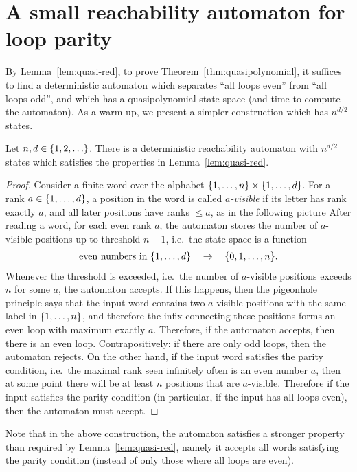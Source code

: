 \section{A small reachability automaton for loop parity}
\label{sec:quasi-separator}
By Lemma~\ref{lem:quasi-red}, to prove Theorem~\ref{thm:quasipolynomial}, it suffices to find a deterministic automaton which  separates ``all loops even'' from ``all loops odd'', and which has a quasipolynomial state space (and time to compute the automaton). As a warm-up, we present a simpler construction which has $n^{d/2}$ states.
\begin{fact}
Let $n,d \in \{1,2,\ldots\}$. There is a deterministic reachability automaton with $n^{d/2}$ states which satisfies the properties in Lemma~\ref{lem:quasi-red}.
\end{fact}
\begin{proof}
Consider a finite word over  the alphabet $\{1,\ldots,n\} \times \{1,\ldots,d\}$. For a rank $a \in \{1,\ldots,d\}$,  a position in the word is called \emph{$a$-visible} if its letter has rank exactly $a$, and all later positions have ranks $\le a$, as in the following picture  
After reading a word, for each even rank $a$, the automaton stores the number of $a$-visible positions up to threshold $n-1$, i.e.~the state space is a function
\begin{align*}
  \text{even numbers in $\{1,\ldots,d\}$} \quad \to \quad \{0,1,\ldots,n\}.
\end{align*}
Whenever the threshold is exceeded, i.e.~the number of $a$-visible positions exceeds  $n$ for some $a$, the automaton accepts. If this happens, then the pigeonhole principle says that the input word contains two $a$-visible positions with the same label in $\{1,\ldots,n\}$, and therefore the infix connecting these positions forms   an even loop with maximum exactly $a$. Therefore, if the automaton accepts, then there is an even loop. Contrapositively: if there are only odd loops, then the automaton rejects. On the other hand, if the input word satisfies the parity condition, i.e.~the maximal rank seen infinitely often is an even number $a$, then at some point there will be at least $n$ positions that are $a$-visible. Therefore if the input satisfies the parity condition (in particular, if the input has all loops even), then the automaton must accept.
\end{proof}

Note that in the above construction, the automaton satisfies a stronger property than required by Lemma~\ref{lem:quasi-red}, namely it accepts all words satisfying the parity condition (instead of only those where all loops are even). 

